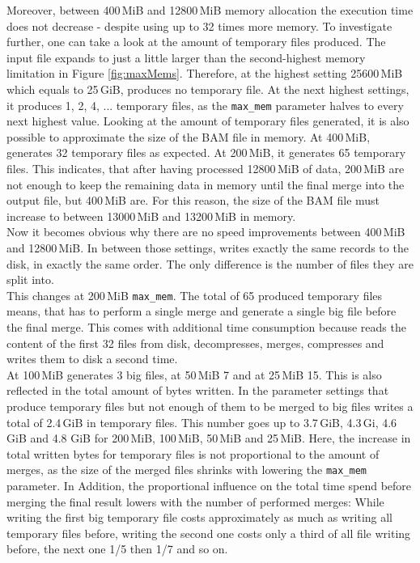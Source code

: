 Moreover, between 400\,MiB and 12800\,MiB memory allocation the execution time does not decrease - despite \sort using up to 32 times more memory. To investigate further, one can take a look at the amount of temporary files produced. The input file expands to just a little larger than the second-highest memory limitation in Figure \ref{fig:maxMems}. Therefore, at the highest setting 25600\,MiB which equals to 25\,GiB, \sort produces no temporary file. At the next highest settings, it produces 1, 2, 4, ... temporary files, as the \texttt{max\_mem} parameter halves to every next highest value. Looking at the amount of temporary files generated, it is also possible to approximate the size of the BAM file in memory. At 400\,MiB, \sort generates 32 temporary files as expected. At 200\,MiB, it generates 65 temporary files. This indicates, that after having processed 12800\,MiB of data, 200\,MiB are not enough to keep the remaining data in memory until the final merge into the output file, but 400\,MiB are. For this reason, the size of the BAM file must increase to between 13000\,MiB and 13200\,MiB in memory. \\
Now it becomes obvious why there are no speed improvements between 400\,MiB and 12800\,MiB. In between those settings, \sort writes exactly the same records to the disk, in exactly the same order. The only difference is the number of files they are split into. \\
This changes at 200\,MiB \texttt{max\_mem}. The total of 65 produced temporary files means, that \sort has to perform a single merge and generate a single big file before the final merge. This comes with additional time consumption because \sort reads the content of the first 32 files from disk, decompresses, merges, compresses  and writes them to disk a second time. \\
At 100\,MiB \sort generates 3 big files, at 50\,MiB 7 and at 25\,MiB 15. This is also reflected in the total amount of bytes written. In the parameter settings that produce temporary files but not enough of them to be merged to big files \sort writes a total of 2.4\,GiB in temporary files. This number goes up to 3.7\,GiB, 4.3\,Gi, 4.6\,GiB and 4.8 GiB for 200\,MiB, 100\,MiB, 50\,MiB and 25\,MiB. Here, the increase in total written bytes for temporary files is not proportional to the amount of merges, as the size of the merged files shrinks with lowering the \texttt{max\_mem} parameter. In Addition, the proportional influence on the total time spend before merging the final result lowers with the number of performed merges: While writing the first big temporary file costs approximately as much as writing all temporary files before, writing the second one costs only a third of all file writing before, the next one 1/5 then 1/7 and so on.\\
